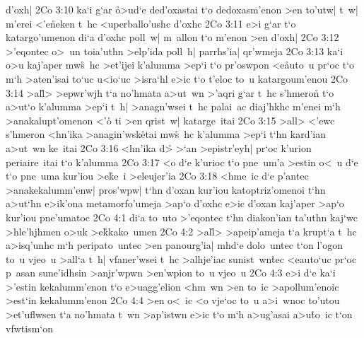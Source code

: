 d'oxh|\bibvsend
\vs 2Co 3:10
ka`i
g`ar
\r{o}>ud`e
ded'oxastai
t`o
dedoxasm'enon
>en
to'utw|
t~w|
m'erei
<'e\r{n}eken
t~hc
<uperballo'ushc
d'oxhc\bibvsend
\vs 2Co 3:11
e>i
g`ar
t`o
katargo'umenon
di`a
d'oxhc
poll~w|
m~allon
t`o
m'enon
>en
d'oxh|\bibvsend
\vs 2Co 3:12
>'eqontec
o>~un
toia'uthn
>elp'ida
poll~h|
parrhs'ia|
qr'wmeja\bibvsend
\vs 2Co 3:13
ka`i
o>u
kaj'aper
mw\r{s}~hc
>et'ijei
k'alumma
>ep`i
t`o
pr'oswpon
<e\r{a}uto~u
pr`oc
t`o
m`h
>aten'isai
to`uc
u<io`uc
>isra`hl
e>ic
t`o
t'eloc
to~u
katargoum'enou\bibvsend
\vs 2Co 3:14
>al\r{l}>
>epwr'wjh
t`a
no'hmata
a>ut~wn
>'aqri
g`ar
t~hc
s'hmero\r{n}
t`o
a>ut`o
k'alumma
>ep`i
t~h|
>anagn'wsei
t~hc
palai~ac
diaj'hkhc
m'enei
m`h
>anakalupt'omenon
<'o\r{}
ti
>en
qrist~w|
katarge~itai\bibvsend
\vs 2Co 3:15
>all>
<'ewc
s'hmeron
<hn'ika
>anagin'wsk\r{e}tai
mw\r{s}~hc
k'alumma
>ep`i
t`hn
kard'ian
a>ut~wn
ke~itai\bibvsend
\vs 2Co 3:16
<hn'ika
d>\r{}
>`an
>epistr'eyh|
pr`oc
k'urion
periaire~itai
t`o
k'alumma\bibvsend
\vs 2Co 3:17
<o
d`e
k'urioc
t`o
pne~um'a
>estin
o<~u
d`e
t`o
pne~uma
kur'iou
>e\r{k}e~i
>eleujer'ia\bibvsend
\vs 2Co 3:18
<hme~ic
d`e
p'antec
>anakekalumm'enw|
pros'wpw|
t`hn
d'oxan
kur'iou
katoptriz'omenoi
t`hn
a>ut`hn
e>ik'ona
metamorfo'umeja
>ap`o
d'oxhc
e>ic
d'oxan
kaj'aper
>ap`o
kur'iou
pne'umatoc\bibvsend
\vs 2Co 4:1
di`a
to~uto
>'eqontec
t`hn
diakon'ian
ta'uthn
kaj`wc
>hle'hjhmen
o>uk
>e\r{k}\-ka\-ko~u\-men\bibvsend
{}
\vs 2Co 4:2
>al\r{l}>
>apeip'ameja
t`a
krupt`a
t~hc
a>isq'unhc
m`h
peripato~untec
>en
panourg'ia|
mhd`e
dolo~untec
t`on
l'ogon
to~u
vjeo~u
>all`a
t~h|
vfaner'wsei
t~hc
>alhje'iac
sunist~wn\r{t}ec
<eauto`uc
pr`oc
p~asan
sune'idhsin
>anjr'wpwn
>en'wpion
to~u
vjeo~u\bibvsend
\vs 2Co 4:3
e>i
d`e
ka`i
>'estin
kekalumm'enon
t`o
e>uagg'elion
<hm~wn
>en
to~ic
>apollum'enoic
>est`in
kekalumm'enon\bibvsend
\vs 2Co 4:4
>en
o<~ic
<o
vje`oc
to~u
a>i~wnoc
to'utou
>et'uflwsen
t`a
no'hmata
t~wn
>ap'istwn
e>ic
t`o
m`h
a>ug'asai
a>u\r{t}o~ic
t`on
vfwtism`on
